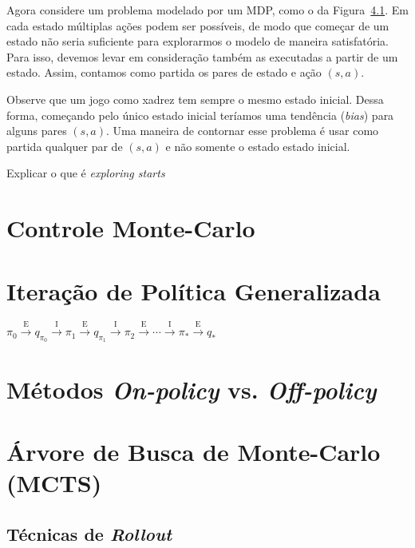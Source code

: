 \documentclass{article}
\begin{document}
        Agora considere um problema modelado por um MDP, como o da Figura~\ref{}. Em cada estado múltiplas ações podem ser possíveis, de modo que começar de um estado não seria suficiente para explorarmos o modelo de maneira satisfatória. Para isso, devemos levar em consideração também as executadas a partir de um estado. Assim, contamos como partida os pares de estado e ação $(s, a)$.
        
        Observe que um jogo como xadrez tem sempre o mesmo estado inicial. Dessa forma, começando pelo único estado inicial teríamos uma tendência (\emph{bias}) para alguns pares $(s, a)$. Uma maneira de contornar esse problema é usar como partida qualquer par de $(s, a)$ e não somente o estado estado inicial.
    
        Explicar o que é \textit{exploring starts}
    
    \section{Controle Monte-Carlo}
    
    \section{Iteração de Política Generalizada}
    
        \begin{center}
            \begin{math}
                \pi_0 \xrightarrow{\ \textrm{E} \ } 
                q_{\pi_0} \xrightarrow{\ \textrm{I} \ } 
                \pi_1 \xrightarrow{\ \textrm{E} \ } 
                q_{\pi_1} \xrightarrow{\ \textrm{I} \ } 
                \pi_2 \xrightarrow{\ \textrm{E} \ } 
                \cdots \xrightarrow{\ \textrm{I} \ }
                \pi_* \xrightarrow{\ \textrm{E} \ } q_{*}
            \end{math}
        \end{center}
    
    \section{Métodos \textit{On-policy} vs. \textit{Off-policy}}
    
    \section{Árvore de Busca de Monte-Carlo (MCTS)}
    
        \subsection{Técnicas de \textit{Rollout}}
        
\end{document}
